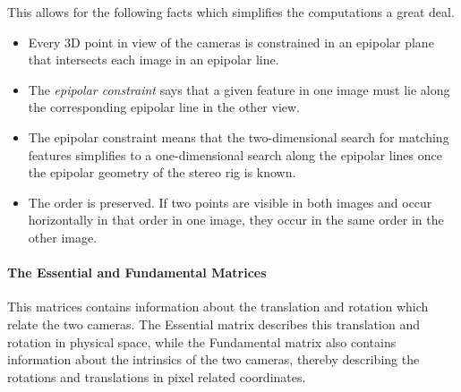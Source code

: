 This allows for the following facts which simplifies the computations a great deal.
\cite{epipolar}
\begin{itemize}
    \item Every 3D point in view of the cameras is constrained in an epipolar plane that
        intersects each image in an epipolar line.
    \item The \emph{epipolar constraint} says that a given feature in one image must lie
        along the corresponding epipolar line in the other view.
    \item The epipolar constraint means that the two-dimensional search for matching
        features simplifies to a one-dimensional search along the epipolar lines once the
        epipolar geometry of the stereo rig is known.
    \item The order is preserved. If two points are visible in both images and occur
        horizontally in that order in one image, they occur in the same order in the other
        image.
\end{itemize}

\paragraph{The Essential and Fundamental Matrices}
This matrices contains information about the translation and rotation which relate the
two cameras. The Essential matrix describes this translation and rotation in physical
space, while the Fundamental matrix also contains information about the intrinsics of the
two cameras, thereby describing the rotations and translations in pixel related
coordinates.

